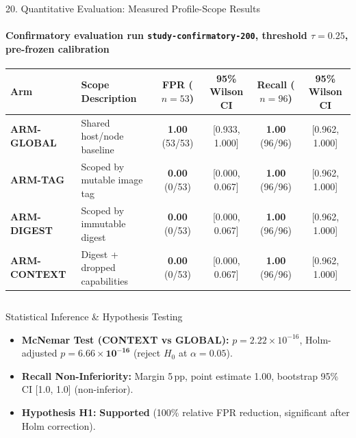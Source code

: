\documentclass[aspectratio=169,10pt]{beamer}
\begin{document}
\begin{frame}{20. Quantitative Evaluation: Measured Profile-Scope Results}
\framesubtitle{Confirmatory evaluation run \texttt{study-confirmatory-200}, threshold $\tau=0.25$, pre-frozen calibration}
\small

\begin{table}\centering\footnotesize
\renewcommand{\arraystretch}{1.2}
\begin{tabularx}{\textwidth}{>{\bfseries}l X c c c c}
\toprule
Arm & Scope Description & FPR ($n=53$) & 95\% Wilson CI & Recall ($n=96$) & 95\% Wilson CI \\
\midrule
ARM-GLOBAL  & Shared host/node baseline    & \textbf{1.00} (53/53) & [0.933, 1.000] & \textbf{1.00} (96/96) & [0.962, 1.000] \\
ARM-TAG     & Scoped by mutable image tag  & \textbf{0.00} (0/53)  & [0.000, 0.067] & \textbf{1.00} (96/96) & [0.962, 1.000] \\
ARM-DIGEST  & Scoped by immutable digest   & \textbf{0.00} (0/53)  & [0.000, 0.067] & \textbf{1.00} (96/96) & [0.962, 1.000] \\
ARM-CONTEXT & Digest + dropped capabilities & \textbf{0.00} (0/53)  & [0.000, 0.067] & \textbf{1.00} (96/96) & [0.962, 1.000] \\
\bottomrule
\end{tabularx}
\end{table}

\vspace{-0.1cm}
\begin{columns}[T,onlytextwidth]
\begin{block}{Statistical Inference \& Hypothesis Testing}
\scriptsize
\begin{itemize}\setlength{\itemsep}{2pt}
  \item \textbf{McNemar Test (CONTEXT vs GLOBAL):} $p = 2.22 \times 10^{-16}$, Holm-adjusted $p = \mathbf{6.66 \times 10^{-16}}$ (reject $H_0$ at $\alpha=0.05$).
  \item \textbf{Recall Non-Inferiority:} Margin 5\,pp, point estimate 1.00, bootstrap 95\% CI [1.0, 1.0] (non-inferior).
  \item \textbf{Hypothesis H1:} \textbf{Supported} (100\% relative FPR reduction, significant after Holm correction).
\end{itemize}
\end{block}


\end{columns}
\end{frame}
\end{document}
